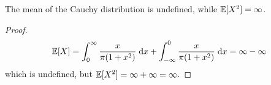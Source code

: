 %
\begin{note}
  \begin{field}
    \begin{prop}
      The mean of the Cauchy distribution is undefined, while $\mathbb{E}[X^2] = \infty$.
    \end{prop}
  \end{field}
  \begin{field}
    \begin{proof}
      \[
        \mathbb{E}[X] = \int_0^\infty \frac{x}{\pi(1 + x^2)}\;\mathrm{d} x + \int_{-\infty}^0 \frac{x}{\pi(1 + x^2)}\;\mathrm{d} x = \infty - \infty
      \]
      which is undefined, but $\mathbb{E}[X^2] = \infty + \infty = \infty$.
    \end{proof}
  \end{field}
  \xplain{}%
\end{note}

